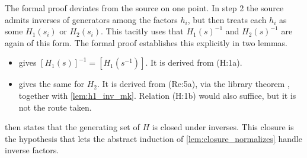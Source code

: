 \documentclass[11pt]{article}
\theoremstyle{definition}
\theoremstyle{remark}
\newcommand{\leanname}[1]{\texttt{\detokenize{#1}}}
\newcommand{\cl}[1]{\left[#1\right]}
\begin{document}
The formal proof deviates from the source on one point. In step 2 the source admits inverses of generators among the factors $h_i$, but then treats each $h_i$ as some $H_1(s_i)$ or $H_2(s_i)$. This tacitly uses that $H_1(s)^{-1}$ and $H_2(s)^{-1}$ are again of this form. The formal proof establishes this explicitly in two lemmas.
\begin{itemize}
\item {} gives $\cl{H_1(s)}^{-1}=\cl{H_1(s^{-1})}$. It is derived from (H:1a).
\item {} gives the same for $H_2$. It is derived from (Re:5a), via the library theorem \leanname{h2_eq_conj}, together with \cref{lem:h1_inv_mk}. Relation (H:1b) would also suffice, but it is not the route taken.
\end{itemize}
 then states that the generating set of $H$ is closed under inverses. This closure is the hypothesis that lets the abstract induction of \cref{lem:closure_normalizes} handle inverse factors.
\end{document}
